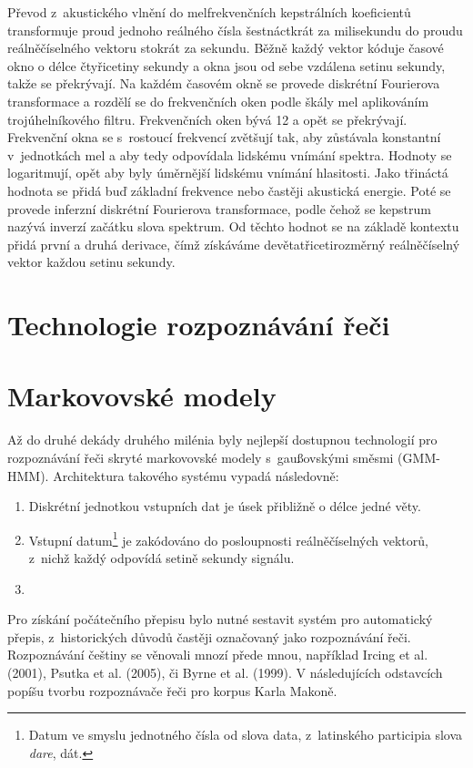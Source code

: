 Převod z~akustického vlnění do melfrekvenčních kepstrálních koeficientů
transformuje proud jednoho reálného čísla šestnáctkrát za milisekundu do proudu
reálněčíselného vektoru stokrát za sekundu. Běžně každý vektor kóduje časové
okno o délce čtyřicetiny sekundy a okna jsou od sebe vzdálena setinu sekundy,
takže se překrývají. Na každém časovém okně se provede diskrétní Fourierova
transformace a rozdělí se do frekvenčních oken podle škály
mel\cite{stevens1937scale} aplikováním trojúhelníkového filtru. Frekvenčních
oken bývá 12 a opět se překrývají. Frekvenční okna se s~rostoucí frekvencí
zvětšují tak, aby zůstávala konstantní v~jednotkách mel a aby tedy odpovídala
lidskému vnímání spektra. Hodnoty se logaritmují, opět aby byly
úměrnější lidskému vnímání hlasitosti. Jako třináctá hodnota se přidá buď
základní frekvence nebo častěji akustická energie. Poté se provede inferzní
diskrétní Fourierova transformace, podle čehož se kepstrum nazývá inverzí
začátku slova spektrum. Od těchto hodnot se na základě kontextu přidá první a
druhá derivace, čímž získáváme devětatřicetirozměrný reálněčíselný vektor každou
setinu sekundy.

\section{Technologie rozpoznávání řeči}

\section{Markovovské modely}

Až do druhé dekády druhého milénia byly nejlepší dostupnou technologií pro
rozpoznávání řeči skryté markovovské modely s~gaußovskými směsmi (GMM-HMM).
Architektura takového systému vypadá následovně:

\begin{enumerate}
\item{Diskrétní jednotkou vstupních dat je úsek přibližně o délce jedné věty.}
\item{Vstupní datum\footnote{Datum ve smyslu jednotného čísla od slova data,
z~latinského participia slova \textit{dare}, dát.} je zakódováno do posloupnosti
reálněčíselných vektorů, z~nichž každý odpovídá setině sekundy signálu.}
\item{}
\end{enumerate}

Pro získání počátečního přepisu bylo nutné sestavit
systém pro automatický přepis, z~historických důvodů častěji označovaný jako
rozpoznávání řeči. Rozpoznávání češtiny se věnovali mnozí přede mnou,
například Ircing et al. (2001)\cite{ircing2001large}, Psutka et al.
(2005)\cite{psutka2005automatic}, či Byrne et al. (1999)\cite{byrne1999large}.
V následujících odstavcích popíšu tvorbu rozpoznávače řeči pro korpus Karla
Makoně.

